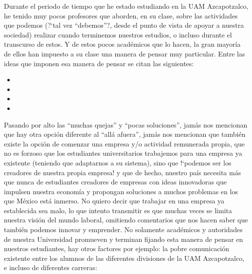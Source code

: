\documentclass[11pt,letterpaper,titlepage]{article}
\begin{document}
Durante el periodo de tiempo que he estado estudiando en la UAM Azcapotzalco, he tenido muy pocos profesores que aborden, en su clase, sobre las actividades que podemos (?`tal vez ``debemos''?, desde el punto de vista de apoyar a nuestra sociedad) realizar cuando terminemos nuestros estudios, o incluso durante el transcurso de estos. Y de estos pocos acad\'emicos que lo hacen, la gran mayor\'ia de ellos han impuesto a su clase una manera de pensar muy particular. Entre las ideas que imponen esa manera de pensar se citan las siguientes:
\begin{itemize}
 \item {}\frqq
 \item {} \frqq
 \item {}\frqq
\item {}\frqq
\end{itemize}
 

Pasando por alto las ``muchas quejas'' y ``pocas soluciones'', jam\'as nos mencionan que hay otra opci\'on diferente al ``all\'a afuera'', jam\'as nos mencionan que tambi\'en existe la opci\'on de comenzar una empresa y/o actividad remunerada propia, que no es forzoso que los estudiantes universitarios trabajemos para una empresa ya existente (teniendo que adaptarnos a su sistema), sino que !`podemos ser los creadores de nuestra propia empresa! y que de hecho, nuestro pa\'is necesita m\'as que nunca de estudiantes creadores de empresas con ideas innovadoras que impulsen nuestra econom\'ia y propongan soluciones a muchos problemas en los que M\'exico est\'a inmerso. No quiero decir que trabajar en una empresa ya establecida sea malo, lo que intento transmitir es que muchas veces se limita nuestra visi\'on del mundo laboral, omitiendo comentarios que nos hacen saber que tambi\'en podemos innovar y emprender. No solamente acad\'emicos y autoridades de nuestra Universidad promueven y terminan fijando esta manera de pensar en nuestros estudiantes, hay otros factores por ejemplo: la pobre comunicaci\'on existente entre los alumnos de las diferentes divisiones de la UAM Azcapotzalco, e incluso de diferentes carreras:
\end{document}
